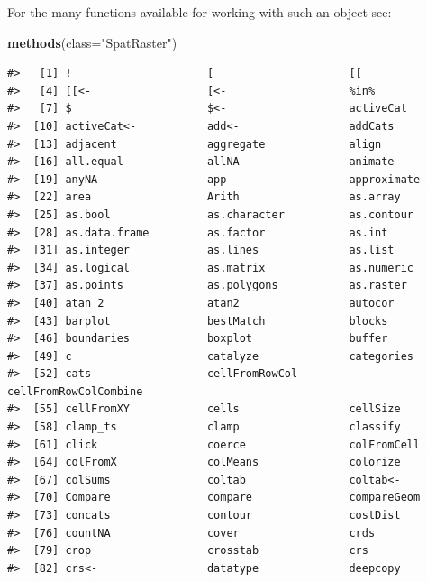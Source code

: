 \documentclass[
]{book}
\newenvironment{Shaded}{\begin{snugshade}}{\end{snugshade}}
\newcommand{\AttributeTok}[1]{\textcolor[rgb]{0.13,0.29,0.53}{#1}}
\newcommand{\FunctionTok}[1]{\textcolor[rgb]{0.13,0.29,0.53}{\textbf{#1}}}
\newcommand{\NormalTok}[1]{#1}
\newcommand{\StringTok}[1]{\textcolor[rgb]{0.31,0.60,0.02}{#1}}
\begin{document}
For the many functions available for working with such an object see:

\begin{Shaded}
\begin{Highlighting}[]
\FunctionTok{methods}\NormalTok{(}\AttributeTok{class=}\StringTok{"SpatRaster"}\NormalTok{)}
\end{Highlighting}
\end{Shaded}

\begin{verbatim}
#>   [1] !                     [                     [[                   
#>   [4] [[<-                  [<-                   %in%                 
#>   [7] $                     $<-                   activeCat            
#>  [10] activeCat<-           add<-                 addCats              
#>  [13] adjacent              aggregate             align                
#>  [16] all.equal             allNA                 animate              
#>  [19] anyNA                 app                   approximate          
#>  [22] area                  Arith                 as.array             
#>  [25] as.bool               as.character          as.contour           
#>  [28] as.data.frame         as.factor             as.int               
#>  [31] as.integer            as.lines              as.list              
#>  [34] as.logical            as.matrix             as.numeric           
#>  [37] as.points             as.polygons           as.raster            
#>  [40] atan_2                atan2                 autocor              
#>  [43] barplot               bestMatch             blocks               
#>  [46] boundaries            boxplot               buffer               
#>  [49] c                     catalyze              categories           
#>  [52] cats                  cellFromRowCol        cellFromRowColCombine
#>  [55] cellFromXY            cells                 cellSize             
#>  [58] clamp_ts              clamp                 classify             
#>  [61] click                 coerce                colFromCell          
#>  [64] colFromX              colMeans              colorize             
#>  [67] colSums               coltab                coltab<-             
#>  [70] Compare               compare               compareGeom          
#>  [73] concats               contour               costDist             
#>  [76] countNA               cover                 crds                 
#>  [79] crop                  crosstab              crs                  
#>  [82] crs<-                 datatype              deepcopy             

\end{verbatim}
\end{document}
